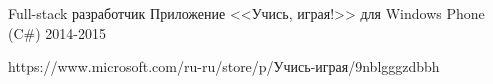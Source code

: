 \begin{cventries}

\cventry
{Full-stack разработчик} %
{Приложение <<Учись, играя!>> для Windows Phone  (C\#) } %
{} %
{2014-2015} %
{ %
 \begin{cvitems}
\item {https://www.microsoft.com/ru-ru/store/p/Учись-играя/9nblgggzdbbh}
 \end{cvitems}
}

\end{cventries}